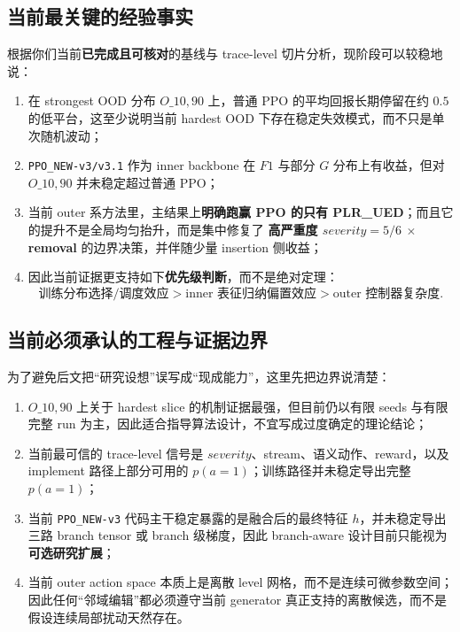 \documentclass[11pt,a4paper]{ctexart}
\begin{document}
\subsection{当前最关键的经验事实}
根据你们当前\textbf{已完成且可核对}的基线与 trace-level 切片分析，现阶段可以较稳地说：
\begin{enumerate}[leftmargin=2.2em,itemsep=0.35em]
    \item 在 strongest OOD 分布 \(O\_{10,90}\) 上，普通 PPO 的平均回报长期停留在约 \(0.5\) 的低平台，这至少说明当前 hardest OOD 下存在稳定失效模式，而不只是单次随机波动；
    \item \texttt{PPO\_NEW-v3/v3.1} 作为 inner backbone 在 \(F1\) 与部分 \(G\) 分布上有收益，但对 \(O\_{10,90}\) 并未稳定超过普通 PPO；
    \item 当前 outer 系方法里，主结果上\textbf{明确跑赢 PPO 的只有 PLR\_UED}；而且它的提升不是全局均匀抬升，而是集中修复了 \textbf{高严重度 \(severity=5/6\) \(\times\) removal} 的边界决策，并伴随少量 insertion 侧收益；
    \item 因此当前证据更支持如下\textbf{优先级判断}，而不是绝对定理：
     \[
     \text{训练分布选择/调度效应} > \text{inner 表征归纳偏置效应} > \text{outer 控制器复杂度}.
     \]
\end{enumerate}

\subsection{当前必须承认的工程与证据边界}
为了避免后文把“研究设想”误写成“现成能力”，这里先把边界说清楚：
\begin{enumerate}[leftmargin=2.2em,itemsep=0.35em]
    \item \(O\_{10,90}\) 上关于 hardest slice 的机制证据最强，但目前仍以有限 seeds 与有限完整 run 为主，因此适合指导算法设计，不宜写成过度确定的理论结论；
    \item 当前最可信的 trace-level 信号是 \(severity\)、stream、语义动作、reward，以及 implement 路径上部分可用的 \(p(a=1)\)；训练路径并未稳定导出完整 \(p(a=1)\)；
    \item 当前 \texttt{PPO\_NEW-v3} 代码主干稳定暴露的是融合后的最终特征 \(h\)，并未稳定导出三路 branch tensor 或 branch 级梯度，因此 branch-aware 设计目前只能视为\textbf{可选研究扩展}；
    \item 当前 outer action space 本质上是离散 level 网格，而不是连续可微参数空间；因此任何“邻域编辑”都必须遵守当前 generator 真正支持的离散候选，而不是假设连续局部扰动天然存在。
\end{enumerate}
\end{document}
